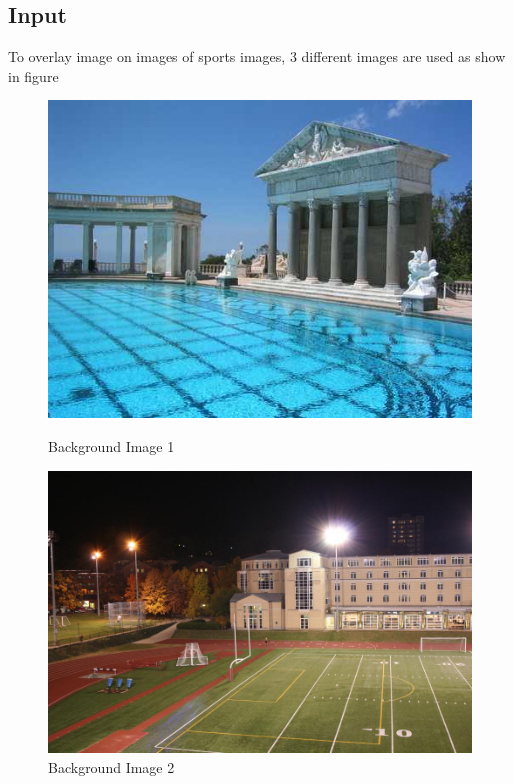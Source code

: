 \documentclass[12pt]{article}
\begin{document}
\subsection{Input}
To overlay image on images of sports images,  3 different images are used as show in figure

\begin{figure}[h]
\centering
\begin{minipage}{0.6\textwidth}
\centering
\includegraphics[scale = 0.45]{swimming.jpg}
\caption{Background Image 1}
\label{fig:Image 1}
\end{minipage}%
\begin{minipage}{.5\textwidth}
\centering
\includegraphics[scale = 0.25]{field.jpg}
\caption{Background Image 2}
\label{fig:Image 2}
\end{minipage}%
\end{figure}
\end{document}
